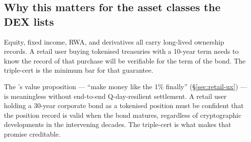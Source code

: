 \subsection{Why this matters for the asset classes the DEX lists}

Equity, fixed income, RWA, and derivatives all carry long-lived
ownership records. A retail user buying tokenised treasuries with
a 10-year term needs to know the record of that purchase will be
verifiable for the term of the bond. The triple-cert is the
minimum bar for that guarantee.

The \Zoo{} \DEX{}'s value proposition --- ``make money like the 1\%
finally'' (\S\ref{sec:retail-ux}) --- is meaningless without
end-to-end Q-day-resilient settlement. A retail user holding a
30-year corporate bond as a tokenised position must be confident
that the position record is valid when the bond matures, regardless
of cryptographic developments in the intervening decades. The
triple-cert is what makes that promise creditable.

